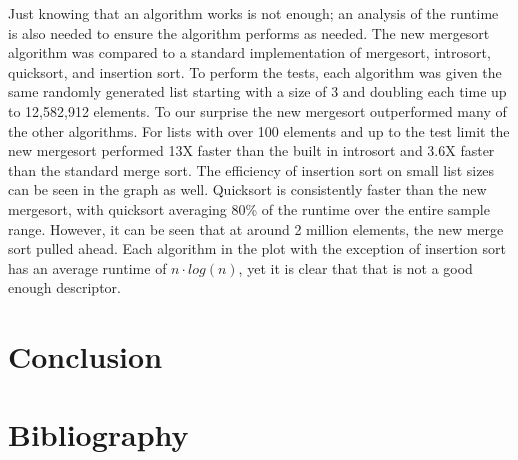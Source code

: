 \documentclass[12pt]{article}
\begin{document}
	Just knowing that an algorithm works is not enough; an analysis of the runtime is also needed to ensure the algorithm performs as needed. 
	The new mergesort algorithm was compared to a standard implementation of mergesort, introsort, quicksort, and insertion sort. 
	To perform the tests, each algorithm was given the same randomly generated list starting with a size of 3 and doubling each time up to 12,582,912 elements. 
	To our surprise the new mergesort outperformed many of the other algorithms. 
	For lists with over 100 elements and up to the test limit the new mergesort performed 13X faster than the built in introsort and 3.6X faster than the standard merge sort. 
	The efficiency of insertion sort on small list sizes can be seen in the graph as well. Quicksort is consistently faster than the new mergesort, with quicksort averaging 80\% of the runtime over the entire sample range. 
	However, it can be seen that at around 2 million elements, the new merge sort pulled ahead. 
	Each algorithm in the plot with the exception of insertion sort has an average runtime of $ n \cdot log (n) $, yet it is clear that that is not a good enough descriptor.




\section{Conclusion}



\section{Bibliography}%
\end{document}
